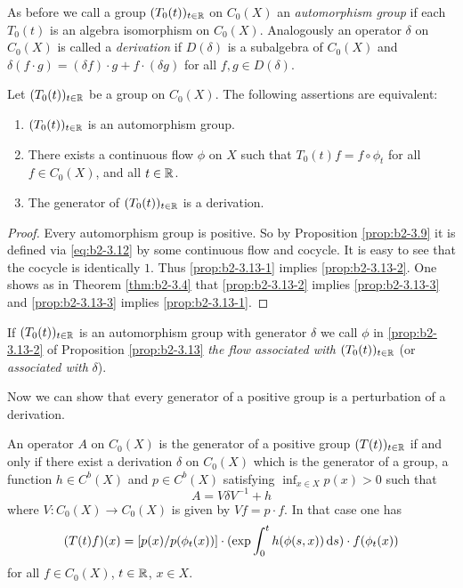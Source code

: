 As before we call a group $(T_{0}(t))_{t \in \mathbb{R}}$ on $C_{0}(X)$ an \emph{automorphism group} if each $T_{0}(t)$ is an algebra isomorphism on $C_{0}(X)$.
Analogously an operator $\delta$ on $C_{0}(X)$ is called a \emph{derivation} if $D(\delta)$ is a subalgebra of $C_{0}(X)$ and $\delta(f \cdot g) = (\delta f) \cdot g + f \cdot (\delta g)$ for all $f,g \in D(\delta)$.

\begin{proposition}\label{prop:b2-3.13}
Let $(T_{0}(t))_{t \in \mathbb{R}}$ be a group on $C_{0}(X)$.
The following assertions are equivalent:
\begin{enumerate}[\upshape (a)]
\item \label{prop:b2-3.13-1}
$(T_{0}(t))_{t \in \mathbb{R}}$ is an automorphism group.
\item \label{prop:b2-3.13-2}
There exists a continuous flow $\phi$ on $X$ such that $T_{0}(t)f = f \circ \phi_{t}$  for all  $f \in C_{0}(X)$, and all $t \in \mathbb{R}$.
\item \label{prop:b2-3.13-3} 
The generator of $(T_{0}(t))_{t \in \mathbb{R}}$ is a derivation.
\end{enumerate}
\end{proposition}

\begin{proof}
Every automorphism group is positive.
So by Proposition \ref{prop:b2-3.9}  it is defined via \eqref{eq:b2-3.12} by some continuous flow and cocycle.
It is easy to see that the cocycle is identically $1$.
Thus \ref{prop:b2-3.13-1} implies \ref{prop:b2-3.13-2}.
One shows as in Theorem \ref{thm:b2-3.4}  that \ref{prop:b2-3.13-2} implies \ref{prop:b2-3.13-3} and \ref{prop:b2-3.13-3} implies \ref{prop:b2-3.13-1}.
\end{proof}

If $(T_{0}(t))_{t \in \mathbb{R}}$ is an automorphism group with generator $\delta$ we call $\phi$ in \ref{prop:b2-3.13-2} of Proposition \ref{prop:b2-3.13} \emph{the flow associated with} $(T_{0}(t))_{t \in \mathbb{R}}$ (or \emph{associated with} $\delta$).

Now we can show that every generator of a positive group is a perturbation of a derivation.
\begin{theorem}\label{thm:b2-3.14}
An operator $A$ on $C_{0}(X)$ is the generator of a positive group $(T(t))_{t \in \mathbb{R}}$ if and only if there exist a derivation $\delta$ on $C_{0}(X)$ which is the generator of a group, a function $h \in C^{b}(X)$ and $p \in C^{b}(X)$ satisfying $\inf_{x \in X} p(x) > 0$ such that
\begin{equation}\label{eq:b2-3.18}
A = V\delta V^{-1} + h
\end{equation}
where $V \colon C_{0}(X) \to C_{0}(X)$ is given by $Vf = p \cdot f$. In that case one has
\begin{equation}\label{eq:b2-3.19}
(T(t)f)(x) = [p(x)/p(\phi_{t}(x))] \cdot (\exp \int_{0}^{t} h(\phi(s,x)) \mathop{}\!\mathrm{d}{s}) \cdot f(\phi_{t}(x))
\end{equation}
for all $f \in C_{0}(X)$, $t \in \mathbb{R}$, $x \in X$.
\end{theorem}

